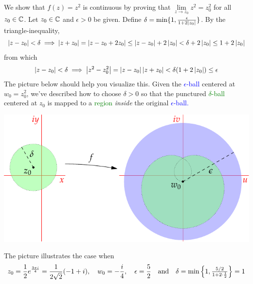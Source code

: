\begin{example}{}{}
We show that $f(z)=z^2$ is continuous by proving that $\lim\limits_{z\to z_0}z^2=z_0^2$ for all $z_0\in\mathbb{C}$.\smallbreak
Let $z_0\in\mathbb{C}$ and $\epsilon>0$ be given. Define $\delta=\min\{1,\frac\epsilon{1+2\left| z_0\right|}\}$. By the triangle-inequality,
\[
\left| z-z_0\right|<\delta\implies \left| z+z_0\right|=\left| z-z_0+2z_0\right|\le \left| z-z_0\right|+2\left| z_0\right|<\delta+2\left| z_0\right|\le 1+2\left| z_0\right|
\]
from which
\[
\left| z-z_0\right|<\delta\implies \left| z^2-z_0^2\right|=\left| z-z_0\right|\left| z+z_0\right|<\delta(1+2\left| z_0\right|)\le \epsilon
\]
The picture below should help you visualize this. Given the \textcolor{blue}{$\epsilon$-ball} centered at $w_0=z_0^2$, we've described how to choose $\delta>0$ so that the punctured \textcolor{Green}{$\delta$-ball} centered at $z_0$ is mapped to a \textcolor{Green}{region} \emph{inside} the original \textcolor{blue}{$\epsilon$-ball.}
\begin{center}
\includegraphics{limits-zsq}
\end{center}
The picture illustrates the case when
\[z_0=\frac 12e^{\frac{3\pi i}{4}}=\frac 1{2\sqrt 2}(-1+i),\quad w_0=-\frac i4,\quad \epsilon=\frac 52\quad\text{and}\quad \delta=\min\left\{1,\tfrac{5/2}{1+2\cdot\frac 12}\right\}=1\]
\end{example}
\goodbreak


